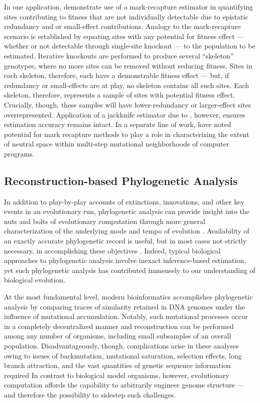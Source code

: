 In one application, \citet{moreno2024methods} demonstrate use of a mark-recapture estimator in quantifying sites contributing to fitness that are not individually detectable due to epistatic redundancy and or small-effect contributions.
Analogy to the mark-recapture scenario is established by equating sites with any potential for fitness effect --- whether or not detectable through single-site knockout --- to the population to be estimated.
Iterative knockouts are performed to produce several ``skeleton'' genotypes, where no more sites can be removed without reducing fitness.
Sites in each skeleton, therefore, each have a demonstrable fitness effect --- but, if redundancy or small-effects are at play, no skeleton contains all such sites.
Each skeleton, therefore, represents a sample of sites with potential fitness effect.
Crucially, though, these samples will have lower-redundancy or larger-effect sites overrepresented.
Application of a jackknife estimator due to \citet{burnham1979robust}, however, ensures estimation accuracy remains intact.
In a separate line of work, \citet{schulte2014software} have noted potential for mark recapture methods to play a role in characterizing the extent of neutral space within multi-step mutational neighborhoods of computer programs.

\subsection{Reconstruction-based Phylogenetic Analysis}

In addition to play-by-play accounts of extinctions, innovations, and other key events in an evolutionary run, phylogenetic analysis can provide insight into the nuts and bolts of evolutionary computation through more general characterization of the underlying mode and tempo of evolution \citep{moreno2023toward,hernandez2022can,shahbandegan2022untangling,lewinsohnStatedependentEvolutionaryModels2023a}.
Availability of an exactly accurate phylogenetic record is useful, but in most cases not strictly necessary, in accomplishing these objectives \citep{moreno2024ecology}.
Indeed, typical biological approaches to phylogenetic analysis involve inexact inference-based estimation, yet such phylogenetic analysis has contributed immensely to our understanding of biological evolution.

At the most fundamental level, modern bioinformatics accomplishes phylogenetic analysis by comparing traces of similarity retained in DNA genomes under the influence of mutational accumulation.
Notably, such mutational processes occur in a completely decentralized manner and reconstruction can be performed among any number of organisms, including small subsamples of an overall population.
Disadvantageously, though, complications arise in these analyses owing to issues of backmutation, mutational saturation, selection effects, long branch attraction, and the vast quantities of genetic sequence information required \citep{TODO}
In contrast to biological model organisms, however, evolutionary computation affords the capability to arbitrarily engineer genome structure --- and therefore the possibility to sidestep such challenges.


